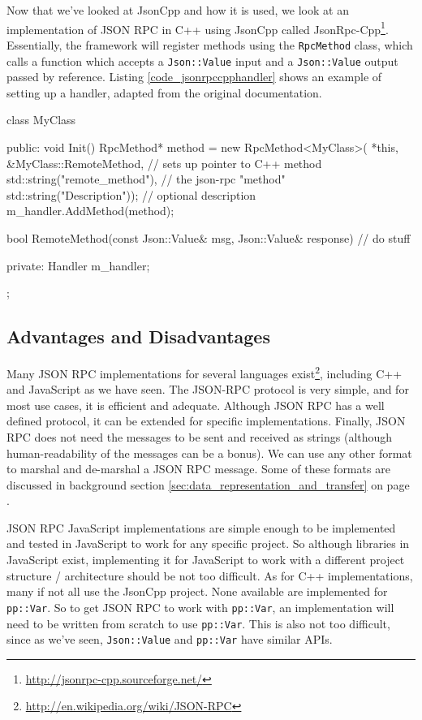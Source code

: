 Now that we've looked at JsonCpp and how it is used, we look at an implementation of JSON RPC in C++ using JsonCpp called JsonRpc-Cpp\footnote{\url{http://jsonrpc-cpp.sourceforge.net/}}. Essentially, the framework will register methods using  the \lstinline{RpcMethod} class, which calls a function which accepts a \lstinline{Json::Value} input and a \lstinline{Json::Value} output passed by reference. Listing \ref{code_jsonrpccpphandler} shows an example of setting up a handler, adapted from the original documentation.

\begin{code}
class MyClass
{
   public:
     void Init()
     {
       RpcMethod* method = new RpcMethod<MyClass>(
           *this, &MyClass::RemoteMethod, // sets up pointer to C++ method
           std::string("remote_method"),  // the json-rpc "method"
           std::string("Description"));   // optional description
       m_handler.AddMethod(method);
     }

     bool RemoteMethod(const Json::Value& msg, Json::Value& response)
     {
       // do stuff
     }

   private:
     Handler m_handler;
};
\end{code}

\subsection{Advantages and Disadvantages} %
\label{sub:jsonrpc_advantages_and_disadvantages}
Many JSON RPC implementations for several languages exist\footnote{\url{http://en.wikipedia.org/wiki/JSON-RPC}}, including C++ and JavaScript as we have seen. The JSON-RPC protocol is very simple, and for most use cases, it is efficient and adequate. Although JSON RPC has a well defined protocol, it can be extended for specific implementations. Finally, JSON RPC does not need the messages to be sent and received as strings (although human-readability of the messages can be a bonus). We can use any other format to marshal and de-marshal a JSON RPC message. Some of these formats are discussed in background section \ref{sec:data_representation_and_transfer} on page \pageref{sec:data_representation_and_transfer}.

JSON RPC JavaScript implementations are simple enough to be implemented and tested in JavaScript to work for any specific project. So although libraries in JavaScript exist, implementing it for JavaScript to work with a different project structure / architecture should be not too difficult. As for C++ implementations, many if not all use the JsonCpp project. None available are implemented for \lstinline{pp::Var}. So to get JSON RPC to work with \lstinline{pp::Var}, an implementation will need to be written from scratch to use \lstinline{pp::Var}. This is also not too difficult, since as we've seen, \lstinline{Json::Value} and \lstinline{pp::Var} have similar APIs.


